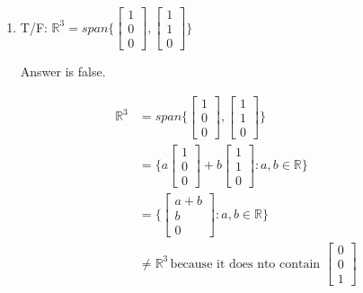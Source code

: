\documentclass[11pt]{article}
\theoremstyle{plain}
\theoremstyle{remark}
\theoremstyle{plain}
\newcommand{\rn}{\mathbb{R}}
\begin{document}
\begin{tcolorbox}[colback=magenta!5!white,colframe=magenta!75!black,title=Problem 5]
    \begin{enumerate}
        \item T/F: $\rn^3=span\{\begin{bmatrix}
            1\\0\\0
        \end{bmatrix}, \begin{bmatrix}
            1\\1\\0
        \end{bmatrix}\}$

        Answer is false.

        \begin{align*}
            \rn^3&=span\{\begin{bmatrix}
                1\\0\\0
            \end{bmatrix},\begin{bmatrix}
                1\\1\\0
            \end{bmatrix}\}\\
            &=\{a\begin{bmatrix}
                1\\0\\0
            \end{bmatrix}+b\begin{bmatrix}
                1\\1\\0
            \end{bmatrix}:a,b\in\rn\}\\
            &=\{\begin{bmatrix}
                a+b\\b\\0
            \end{bmatrix}:a,b\in\rn\}\\
            &\neq \rn^3 \,\text{because it does nto contain }\begin{bmatrix}
                0\\0\\1
            \end{bmatrix}
        \end{align*}
    \end{enumerate}
\end{tcolorbox}   
\end{document}
